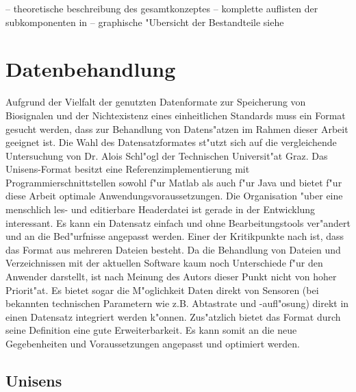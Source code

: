 -- theoretische beschreibung des gesamtkonzeptes
-- komplette auflisten der subkomponenten in 
-- graphische "Ubersicht der Bestandteile siehe 

\section{Datenbehandlung}

Aufgrund der Vielfalt der genutzten Datenformate zur Speicherung von Biosignalen und der Nichtexistenz eines einheitlichen Standards \cite{Schlogl2009, Varri2001, Wang2010} muss ein Format gesucht werden, dass zur Behandlung von Datens"atzen im Rahmen dieser Arbeit geeignet ist.
Die Wahl des Datensatzformates st"utzt sich auf die vergleichende Untersuchung \cite{Schlogl2009} von Dr. Alois Schl"ogl der Technischen Universit"at Graz.
Das Unisens-Format besitzt eine Referenzimplementierung mit Programmierschnittstellen sowohl f"ur Matlab als auch f"ur Java und bietet f"ur diese Arbeit optimale Anwendungsvoraussetzungen.
Die Organisation "uber eine menschlich les- und editierbare Headerdatei ist gerade in der Entwicklung interessant.
Es kann ein Datensatz einfach und ohne Bearbeitungstools ver"andert und an die Bed"urfnisse angepasst werden.
Einer der Kritikpunkte nach \cite{Schlogl2009} ist, dass das Format aus mehreren Dateien besteht.
Da die Behandlung von Dateien und Verzeichnissen mit der aktuellen Software kaum noch Unterschiede f"ur den Anwender darstellt, ist nach Meinung des Autors dieser Punkt nicht von hoher Priorit"at.
Es bietet sogar die M"oglichkeit Daten direkt von Sensoren (bei bekannten technischen Parametern wie z.B. Abtastrate und -aufl"osung) direkt in einen Datensatz integriert werden k"onnen.
Zus"atzlich bietet das Format durch seine Definition eine gute Erweiterbarkeit.
Es kann somit an die neue Gegebenheiten und Voraussetzungen angepasst und optimiert werden.


\subsection{Unisens}

